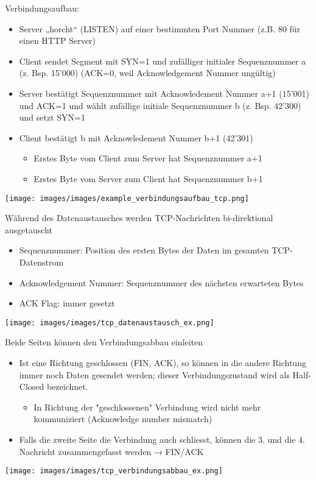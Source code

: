 \begin{example}
    Verbindungsaufbau:
    \begin{itemize}
        \item Server „horcht“ (LISTEN) auf einer bestimmten Port Nummer (z.B. 80 für einen HTTP Server)
        \item Client sendet Segment mit SYN=1 und zufälliger initialer Sequenznummer a (z. Bsp. 15'000) (ACK=0, weil Acknowledgement Nummer ungültig)
        \item Server bestätigt Sequenznummer mit Acknowledement Nummer a+1 (15'001) und ACK=1 und wählt zufällige initiale Sequenznummer b (z. Bsp. 42'300) und setzt SYN=1
        \item Client bestätigt b mit Acknowledement Nummer b+1 (42'301)
        \begin{itemize}
            \item Erstes Byte vom Client zum Server hat Sequenznummer a+1
            \item Erstes Byte vom Server zum Client hat Sequenznummer b+1
        \end{itemize}
    \end{itemize}
        \texttt{[image: images/images/example\_verbindungsaufbau\_tcp.png]}
\end{example}

\begin{example}
    Während des Datenaustausches werden TCP-Nachrichten bi-direktional ausgetauscht
    \begin{itemize}
        \item Sequenznummer: Position des ersten Bytes der Daten im gesamten TCP-Datenstrom
        \item Acknowledgement Nummer: Sequenznummer des nächsten erwarteten Bytes
        \item ACK Flag: immer gesetzt
    \end{itemize}
        \texttt{[image: images/images/tcp\_datenaustausch\_ex.png]}
\end{example}

\begin{example}
    Beide Seiten können den Verbindungsabbau einleiten
    \begin{itemize}
        \item Ist eine Richtung geschlossen (FIN, ACK), so können in die andere Richtung immer noch Daten gesendet werden; dieser Verbindungszustand wird als Half-Closed bezeichnet.
        \begin{itemize}
            \item In Richtung der "geschlossenen" Verbindung wird nicht mehr kommuniziert (Acknowledge number mismatch)
        \end{itemize}
        \item Falls die zweite Seite die Verbindung auch schliesst, können die 3. und die 4. Nachricht zusammengefasst werden → FIN/ACK
    \end{itemize}
        \texttt{[image: images/images/tcp\_verbindungsabbau\_ex.png]}
\end{example}





